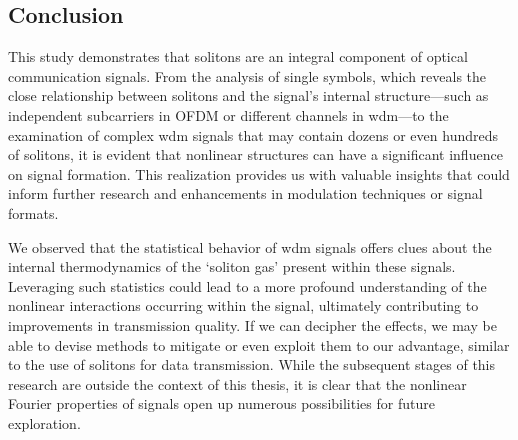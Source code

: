 \subsection{Conclusion}

This study demonstrates that solitons are an integral component of optical communication signals. From the analysis of single symbols, which reveals the close relationship between solitons and the signal's internal structure—such as independent subcarriers in OFDM or different channels in \gls{wdm}—to the examination of complex \gls{wdm} signals that may contain dozens or even hundreds of solitons, it is evident that nonlinear structures can have a significant influence on signal formation. This realization provides us with valuable insights that could inform further research and enhancements in modulation techniques or signal formats.

We observed that the statistical behavior of \gls{wdm} signals offers clues about the internal thermodynamics of the `soliton gas' present within these signals. Leveraging such statistics could lead to a more profound understanding of the nonlinear interactions occurring within the signal, ultimately contributing to improvements in transmission quality. If we can decipher the effects, we may be able to devise methods to mitigate or even exploit them to our advantage, similar to the use of solitons for data transmission. While the subsequent stages of this research are outside the context of this thesis, it is clear that the nonlinear Fourier properties of signals open up numerous possibilities for future exploration.
